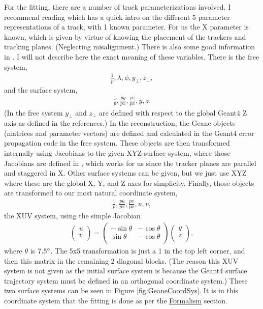 	For the fitting, there are a number of track parameterizations involved. I recommend reading \cite{geanemanual} which has a quick intro on the different 5 parameter representations of a track, with 1 known parameter. For us the X parameter is known, which is given by virtue of knowing the placement of the trackers and tracking planes. (Neglecting misalignment.) There is also some good information in \cite{Lavezzi}. I will not describe here the exact meaning of these variables. There is the free system, 
		\begin{align}
			\frac{1}{p}, \lambda, \phi, y_{\perp}, z_{\perp},
		\end{align}
	and the surface system,
		\begin{align}
			\frac{1}{p}, \frac{py}{px}, \frac{pz}{px}, y, z.
		\end{align}
	(In the free system $y_{\perp}$ and $ z_{\perp}$ are defined with respect to the global Geant4 Z axis as defined in the references.) In the reconstruction, the Geane objects (matrices and parameter vectors) are defined and calculated in the Geant4 error propagation code in the free system. These objects are then transformed internally using Jacobians to the given XYZ surface system, where those Jacobians are defined in \cite{jacob}, which works for us since the tracker planes are parallel and staggered in X. Other surface systems can be given, but we just use XYZ where these are the global X, Y, and Z axes for simplicity. Finally, those objects are transformed to our most natural coordinate system,
		\begin{align}
			\frac{1}{p}, \frac{pu}{px}, \frac{pv}{px}, u, v,
		\end{align}
	the XUV system, using the simple Jacobian
		\begin{align}
			\begin{pmatrix}
				u \\
				v \\
			\end{pmatrix} =
			\begin{pmatrix}
				-\sin{\theta} & -\cos{\theta} \\
				\sin{\theta} & -\cos{\theta} \\
			\end{pmatrix}
			\begin{pmatrix}
				y \\
				z \\
			\end{pmatrix},
		\end{align}
	where $\theta$ is $7.5\degree$. The 5x5 transformation is just a 1 in the top left corner, and then this matrix in the remaining 2 diagonal blocks. (The reason this XUV system is not given as the initial surface system is because the Geant4 surface trajectory system must be defined in an orthogonal coordinate system.) These two surface systems can be seen in Figure \ref{fig:GeaneCoordSys}. It is in this coordinate system that the fitting is done as per the \hyperref[sec:Formalism]{Formalism} section.

